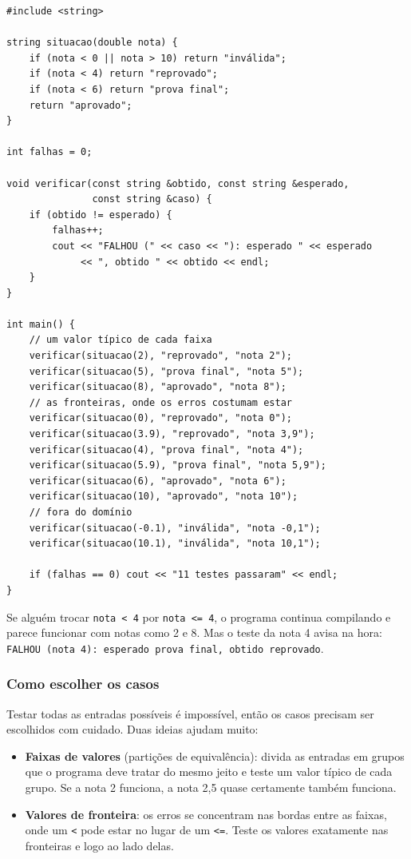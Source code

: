 \begin{codigo}
\begin{Verbatim}[breaklines=true, breaksymbolleft={}, fontsize=\footnotesize]
#include <string>

string situacao(double nota) {
    if (nota < 0 || nota > 10) return "inválida";
    if (nota < 4) return "reprovado";
    if (nota < 6) return "prova final";
    return "aprovado";
}

int falhas = 0;

void verificar(const string &obtido, const string &esperado,
               const string &caso) {
    if (obtido != esperado) {
        falhas++;
        cout << "FALHOU (" << caso << "): esperado " << esperado
             << ", obtido " << obtido << endl;
    }
}

int main() {
    // um valor típico de cada faixa
    verificar(situacao(2), "reprovado", "nota 2");
    verificar(situacao(5), "prova final", "nota 5");
    verificar(situacao(8), "aprovado", "nota 8");
    // as fronteiras, onde os erros costumam estar
    verificar(situacao(0), "reprovado", "nota 0");
    verificar(situacao(3.9), "reprovado", "nota 3,9");
    verificar(situacao(4), "prova final", "nota 4");
    verificar(situacao(5.9), "prova final", "nota 5,9");
    verificar(situacao(6), "aprovado", "nota 6");
    verificar(situacao(10), "aprovado", "nota 10");
    // fora do domínio
    verificar(situacao(-0.1), "inválida", "nota -0,1");
    verificar(situacao(10.1), "inválida", "nota 10,1");

    if (falhas == 0) cout << "11 testes passaram" << endl;
}
\end{Verbatim}
\end{codigo}

Se alguém trocar \texttt{nota < 4} por \texttt{nota <= 4}, o programa continua compilando e parece funcionar com notas como 2 e 8. Mas o teste da nota 4 avisa na hora: \texttt{FALHOU (nota 4): esperado prova final, obtido reprovado}.

\subsubsection{Como escolher os casos}

Testar todas as entradas possíveis é impossível, então os casos precisam ser escolhidos com cuidado. Duas ideias ajudam muito:

\begin{itemize}
  \item \textbf{Faixas de valores} (partições de equivalência): divida as entradas em grupos que o programa deve tratar do mesmo jeito e teste um valor típico de cada grupo. Se a nota 2 funciona, a nota 2,5 quase certamente também funciona.
  \item \textbf{Valores de fronteira}: os erros se concentram nas bordas entre as faixas, onde um \texttt{<} pode estar no lugar de um \texttt{<=}. Teste os valores exatamente nas fronteiras e logo ao lado delas.
\end{itemize}

